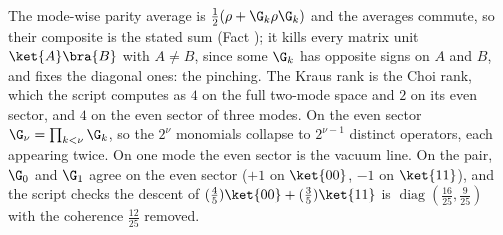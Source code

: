 The mode-wise parity average is $\tfrac12(\rho + \G_{k}\rho\G_{k})$ and the averages commute, so their composite is the stated sum (Fact ); it kills every matrix unit $\ket{A}\bra{B}$ with $A \neq B$, since some $\G_{k}$ has opposite signs on $A$ and $B$, and fixes the diagonal ones: the pinching. The Kraus rank is the Choi rank, which the script computes as $4$ on the full two-mode space and $2$ on its even sector, and $4$ on the even sector of three modes. On the even sector $\G_{\nu} = \prod_{k < \nu}\G_{k}$, so the $2^{\nu}$ monomials collapse to $2^{\nu-1}$ distinct operators, each appearing twice. On one mode the even sector is the vacuum line. On the pair, $\G_{0}$ and $\G_{1}$ agree on the even sector ($+1$ on $\ket{00}$, $-1$ on $\ket{11}$), and the script checks the descent of $(\tfrac45)\ket{00} + (\tfrac35)\ket{11}$ is $\operatorname{diag}(\tfrac{16}{25}, \tfrac{9}{25})$ with the coherence $\tfrac{12}{25}$ removed.

